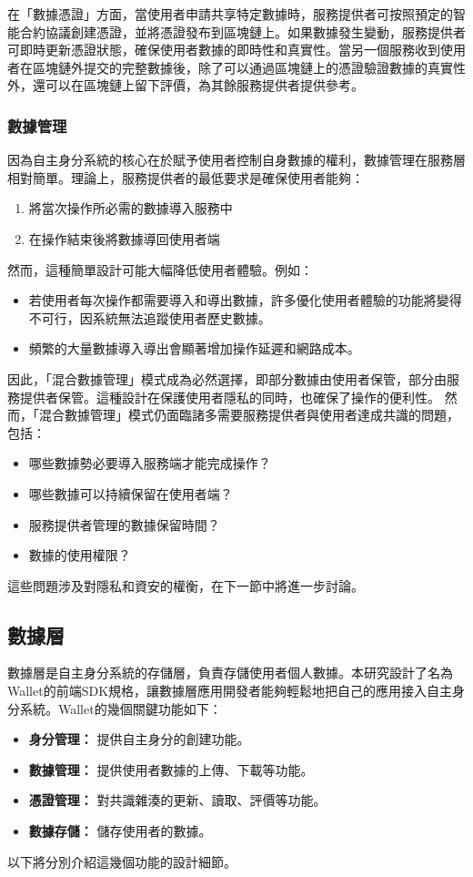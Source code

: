 在「數據憑證」方面，當使用者申請共享特定數據時，服務提供者可按照預定的智能合約協議創建憑證，並將憑證發布到區塊鏈上。如果數據發生變動，服務提供者可即時更新憑證狀態，確保使用者數據的即時性和真實性。當另一個服務收到使用者在區塊鏈外提交的完整數據後，除了可以通過區塊鏈上的憑證驗證數據的真實性外，還可以在區塊鏈上留下評價，為其餘服務提供者提供參考。
\subsubsection{數據管理}
因為自主身分系統的核心在於賦予使用者控制自身數據的權利，數據管理在服務層相對簡單。理論上，服務提供者的最低要求是確保使用者能夠：
\begin{enumerate}
  \item 將當次操作所必需的數據導入服務中
  \item 在操作結束後將數據導回使用者端
\end{enumerate}
然而，這種簡單設計可能大幅降低使用者體驗。例如：
\begin{itemize}
  \item 若使用者每次操作都需要導入和導出數據，許多優化使用者體驗的功能將變得不可行，因系統無法追蹤使用者歷史數據。
  \item 頻繁的大量數據導入導出會顯著增加操作延遲和網路成本。
\end{itemize}
因此，「混合數據管理」模式成為必然選擇，即部分數據由使用者保管，部分由服務提供者保管。這種設計在保護使用者隱私的同時，也確保了操作的便利性。
然而，「混合數據管理」模式仍面臨諸多需要服務提供者與使用者達成共識的問題，包括：
\begin{itemize}
  \item 哪些數據勢必要導入服務端才能完成操作？
  \item 哪些數據可以持續保留在使用者端？
  \item 服務提供者管理的數據保留時間？
  \item 數據的使用權限？
\end{itemize}
這些問題涉及對隱私和資安的權衡，在下一節中將進一步討論。
\subsection{數據層}
數據層是自主身分系統的存儲層，負責存儲使用者個人數據。本研究設計了名為Wallet的前端SDK規格，讓數據層應用開發者能夠輕鬆地把自己的應用接入自主身分系統。Wallet的幾個關鍵功能如下：
\begin{itemize}
  \item \textbf{身分管理：} 提供自主身分的創建功能。
  \item \textbf{數據管理：} 提供使用者數據的上傳、下載等功能。
  \item \textbf{憑證管理：} 對共識雜湊的更新、讀取、評價等功能。
  \item \textbf{數據存儲：} 儲存使用者的數據。
\end{itemize}
以下將分別介紹這幾個功能的設計細節。
